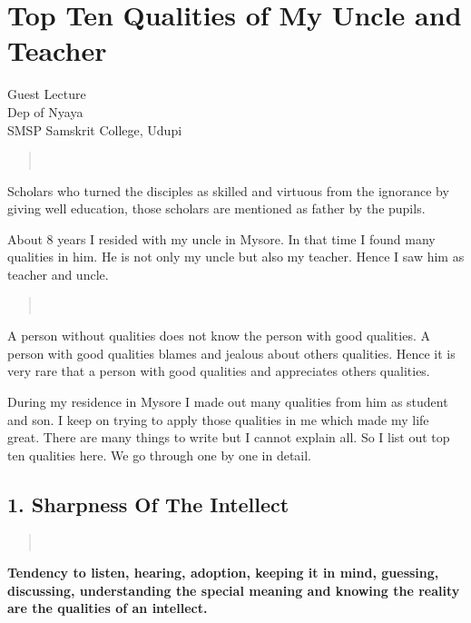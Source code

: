 \chapter{Top Ten Qualities of My Uncle and Teacher}

\begin{center}
\smallskip
Guest Lecture\\
Dep of Nyaya\\
SMSP Samskrit College, Udupi
\addrule
\end{center}

\begin{verse}
\\
\end{verse}
Scholars who turned the disciples as skilled and virtuous from the ignorance by giving well education, those scholars are mentioned as father by the pupils.

About 8 years I resided with my uncle in Mysore. In that time I found many qualities in him. He is not only my uncle but also my teacher. Hence I saw him as teacher and uncle.
\begin{verse}
\\
\end{verse}
A person without qualities does not know the person with good qualities. A person with good qualities blames and jealous about others qualities. Hence it is very rare that a person with good qualities and appreciates others qualities.

During my residence in Mysore I made out many qualities from him as student and son. I keep on trying to apply those qualities in me which made my life great. There are many things to write but I cannot explain all. So I list out top ten qualities here. We go through one by one in detail.

\section*{1. Sharpness Of The Intellect }

\begin{verse}
\\
\end{verse}
\textbf{Tendency to listen, hearing, adoption, keeping it in mind, guessing, discussing, understanding the special meaning and knowing the reality are the qualities of an intellect.}

